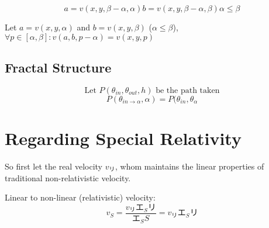 \documentclass[preprint]{ptephy_v1}%
\newcommand{\jp}[1]{#1}
\newcommand{\jp}[1]{\text{#1}}
\begin{document}

\begin{subequations}
\begin{equation}
a=v(x, y, \beta-\alpha, \alpha)
\end{equation}
\begin{equation}
b=v(x, y, \beta-\alpha, \beta)
\end{equation}
\begin{equation}
\alpha\leq\beta
\end{equation}
\end{subequations}

Let $a=v(x, y, \alpha)$ and $b=v(x, y, \beta)$ ($\alpha\leq\beta$), $\forall p\in[\alpha, \beta]: v(a, b, p-\alpha)=v(x, y, p)$

\subsection{Fractal Structure}
\begin{equation}
    \text{Let }P(\theta_{in}, \theta_{out}, h)\text{ be the path taken}
\end{equation}
\begin{equation}
    P(\theta_{in\to\alpha}, \alpha)=P(\theta_{in}, \theta_{\alpha}
\end{equation}


\newpage
\section{Regarding Special Relativity}
So first let the real velocity \(v_リ\), whom maintains the linear properties of traditional non-relativistic velocity.


Linear to non-linear (relativistic) velocity:
\begin{equation}
    v_S=\frac{v_\jp{リ}\jp{エ}_S\jp{リ}}{\jp{エ}_SS}=v_\jp{リ}\jp{エ}_S\jp{リ}
\end{equation}
\end{document}

